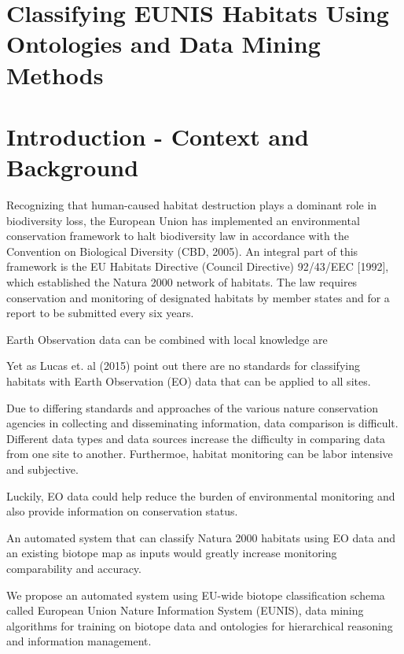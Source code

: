 \documentclass[a4paper,12pt]{article}
\begin{document}
\section{Classifying EUNIS Habitats Using Ontologies and Data Mining Methods}

\section{Introduction - Context and Background}
Recognizing that human-caused habitat destruction plays a dominant role in
biodiversity loss, the European Union has implemented an environmental
conservation framework to halt biodiversity law in accordance with the
Convention on Biological Diversity (CBD, 2005). An integral part of this
framework is the EU Habitats Directive (Council Directive) 92/43/EEC [1992],
which established the Natura 2000 network of habitats. The law requires
conservation and monitoring of designated habitats by member states and for a
report to be submitted every six years. 

Earth Observation data can be combined with  local knowledge are

Yet as Lucas et. al (2015) point out there are no standards for classifying
habitats with Earth Observation (EO) data that can be applied to all sites. 

Due to differing standards and approaches of the various nature conservation
agencies in collecting and disseminating information, data comparison is
difficult. Different data types and data sources increase the difficulty in
comparing data from one site to another. Furthermoe, habitat monitoring can
be labor intensive and subjective.

Luckily, EO data could help reduce the burden of environmental monitoring and
also provide information on conservation status.

An automated system that can classify Natura 2000 habitats using EO
data and an existing biotope map as inputs would greatly increase monitoring
comparability and accuracy. 

We propose an automated system using 
EU-wide biotope classification schema called European Union Nature Information
System (EUNIS), data mining algorithms for training on biotope data and
ontologies for hierarchical reasoning and information management.
\end{document}
